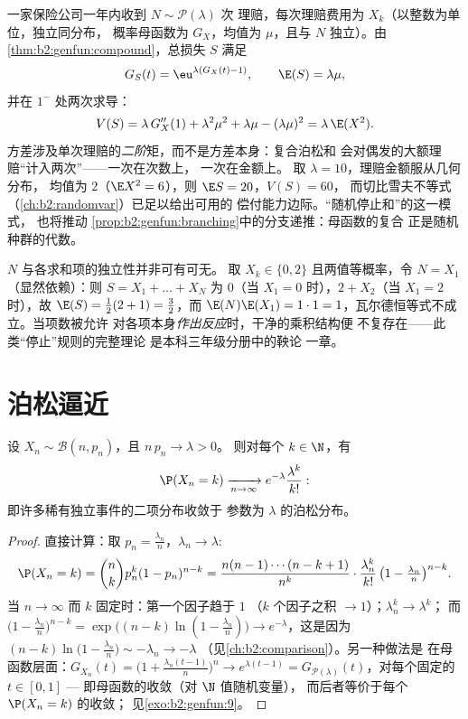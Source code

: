 \begin{example}\label{ex:b2:genfun:compoundpoisson}
一家保险公司一年内收到 $N \sim \mathcal P(\lambda)$ 次
理赔，每次理赔费用为 $X_k$（以整数为单位，独立同分布，
概率母函数为 $G_X$，均值为 $\mu$，且与 $N$ 独立）。由
\cref{thm:b2:genfun:compound}，总损失 $S$ 满足
\[
G_S(t) = \eu^{\lambda(G_X(t) - 1)},
\qquad
\E(S) = \lambda\mu ,
\]
并在 $1^-$ 处两次求导：
\[
V(S) = \lambda\,G_X''(1) + \lambda^2\mu^2 + \lambda\mu -
(\lambda\mu)^2 = \lambda\,\E(X^2) .
\]
方差涉及单次理赔的\emph{二阶}矩，而不是方差本身：复合泊松和
会对偶发的大额理赔“计入两次”——一次在次数上，
一次在金额上。
取 $\lambda = 10$，理赔金额服从几何分布，
均值为 $2$（$\E X^2 = 6$），则 $\E S = 20$，$V(S) = 60$，
而切比雪夫不等式（\cref{ch:b2:randomvar}）已足以给出可用的
偿付能力边际。“随机停止和”的这一模式，
也将推动
\cref{prop:b2:genfun:branching}中的分支递推：母函数的复合
正是随机种群的代数。
\end{example}

\begin{remark}
$N$ 与各求和项的独立性并非可有可无。
取 $X_k \in \{0, 2\}$ 且两值等概率，令 $N =
X_1$（显然依赖）：则 $S = X_1 + \dots + X_N$ 为
$0$（当 $X_1 = 0$ 时），$2 + X_2$（当 $X_1 = 2$ 时），故 $\E(S) =
\frac12(2 + 1) = \frac32$，而 $\E(N)\E(X_1) = 1\cdot1 =
1$，瓦尔德恒等式不成立。当项数被允许
对各项本身\emph{作出反应}时，干净的乘积结构便
不复存在——此类“停止”规则的完整理论
是本科三年级分册中的鞅论
一章。
\end{remark}

\section{泊松逼近}

\begin{theorem}[稀有事件律]\label{thm:b2:genfun:rareevents}
设 $X_n \sim \mathcal{B}(n, p_n)$，且 $n\,p_n \to \lambda > 0$。
则对每个 $k \in \N$，有
\[
\P(X_n = k)
\xrightarrow[n\to\infty]{}
e^{-\lambda}\frac{\lambda^k}{k!} :
\]
即许多稀有独立事件的二项分布收敛于
参数为 $\lambda$ 的泊松分布。
\end{theorem}

\begin{proof}
直接计算：取 $p_n = \frac{\lambda_n}{n}$，$\lambda_n
\to \lambda$:
\[
\P(X_n = k)
= \binom nk p_n^k(1 - p_n)^{n-k}
= \frac{n(n-1)\cdots(n-k+1)}{n^k}\cdot
\frac{\lambda_n^k}{k!}\,
\bigl(1 - \tfrac{\lambda_n}{n}\bigr)^{n-k} .
\]
当 $n \to \infty$ 而 $k$ 固定时：第一个因子趋于 $1$
（$k$ 个因子之积 $\to 1$）；$\lambda_n^k \to \lambda^k$；
而 $\bigl(1 - \frac{\lambda_n}{n}\bigr)^{n-k} =
\exp\bigl((n-k)\ln(1 - \frac{\lambda_n}{n})\bigr) \to
e^{-\lambda}$，这是因为 $(n - k)\ln\bigl(1 - \frac{\lambda_n}{n}\bigr)
\sim -\lambda_n \to -\lambda$
（见\cref{ch:b2:comparison}）。另一种做法是
在母函数层面：$G_{X_n}(t) = \bigl(1 +
\frac{\lambda_n(t-1)}{n}\bigr)^n \to e^{\lambda(t - 1)} =
G_{\mathcal{P}(\lambda)}(t)$，对每个固定的 $t \in [0, 1]$ ---
即母函数的收敛（对 $\N$ 值随机变量），
而后者等价于每个 $\P(X_n = k)$ 的收敛；
见\cref{exo:b2:genfun:9}。
\end{proof}

